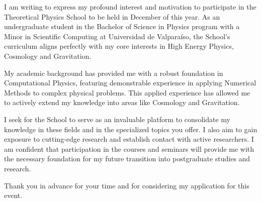 I am writing to express my profound interest and motivation to participate in the Theoretical Physics School to be held in December of this year. As an undergraduate student in the Bachelor of Science in Physics program with a Minor in Scientific Computing at Universidad de Valparaíso, the School’s curriculum aligns perfectly with my core interests in High Energy Physics, Cosmology and Gravitation.

My academic background has provided me with a robust foundation in Computational Physics, featuring demonstrable experience in applying Numerical Methods to complex physical problems. This applied experience has allowed me to actively extend my knowledge into areas like Cosmology and Gravitation.

I seek for the School to serve as an invaluable platform to consolidate my knowledge in these fields and in the specialized topics you offer. I also aim to gain exposure to cutting-edge research and establish contact with active researchers. I am confident that participation in the courses and seminars will provide me with the necessary foundation for my future transition into postgraduate studies and research.

Thank you in advance for your time and for considering my application for this event.